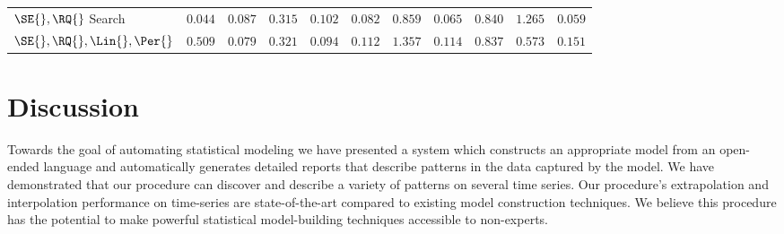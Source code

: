 \begin{table*}[ht!]
{\begin{center}
\begin{tabularx}{\textwidth}{l | XXXXX | XXXXX}
$\SE{}, \RQ{}$ Search
& $\mathbf{0.044}$ & $\mathbf{0.087}$ & $\mathbf{0.315}$ & $\mathbf{0.102}$ & $\mathbf{0.082}$
& $\mathbf{0.859}$ & $\mathbf{0.065}$ & $\mathbf{0.840}$ & $1.265$ & $\mathbf{0.059}$ \\
$\SE{}, \RQ{}, \Lin{}, \Per{}$
& $\mathbf{0.509}$ & $\mathbf{0.079}$ & $\mathbf{0.321}$ & $\mathbf{0.094}$ & $\mathbf{0.112}$
& $\mathbf{1.357}$ & $\mathbf{0.114}$ & $\mathbf{0.837}$ & $\mathbf{0.573}$ & $\mathbf{0.151}$ \\
\end{tabularx}
\end{center}
}
\end{table*}

%
%
%




\section{Discussion}



Towards the goal of automating statistical modeling we have presented a system which constructs an appropriate model from an open-ended language and automatically generates detailed reports that describe patterns in the data captured by the model.
We have demonstrated that our procedure can discover and describe a variety of patterns on several time series.
Our procedure's extrapolation and interpolation performance on time-series are state-of-the-art compared to existing model construction techniques.
We believe this procedure has the potential to make powerful statistical model-building techniques accessible to non-experts.

%

